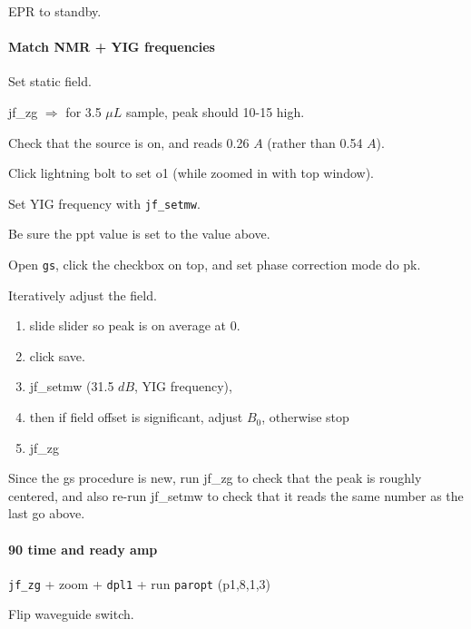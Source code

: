 EPR to standby.

\paragraph{ Match NMR + YIG frequencies}
Set static field.

jf\_zg $\Rightarrow$ for 3.5 $\mu L$ sample, peak should 10-15 high.

Check that the source is on, and reads 0.26 $A$ (rather than 0.54 $A$).

Click lightning bolt to set o1 (while zoomed in with top window).

Set YIG frequency with \texttt{jf\_setmw}.

Be sure the ppt value is set to the value above.

Open \texttt{gs}, click the checkbox on top, and set phase correction mode do pk. 

Iteratively adjust the field.
{\small
\begin{enumerate}
    \item slide slider so peak is on average at 0. 
    \item click save. 
	\item jf\_setmw (31.5 $dB$, YIG frequency),
	\item then if field offset is significant, adjust $B_0$, otherwise stop
	\item jf\_zg
\end{enumerate}
}

Since the gs procedure is new,
run jf\_zg to check that the peak is roughly centered,
and also re-run jf\_setmw to check that it
reads the same number as the last go above.

\paragraph{90 time and ready amp}
{\tt jf\_zg} + zoom + {\tt dpl1} + run {\tt paropt} (p1,8,1,3)

Flip waveguide switch.

